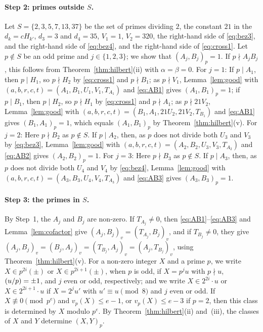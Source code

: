 \documentclass[11pt]{article}
\newcommand{\leg}[2]{\mathchoice{\biggl(\dfrac{#1}{#2}\biggr)}{(#1/#2)}{(#1/#2)}{(#1/#2)}}
\begin{document}
\paragraph{Step 2: primes outside $S$.} Let $S=\{2,3,5,7,13,37\}$ be the set of primes dividing $2$, the constant $21$ in the $d_k=cH_{k'}$, $d_{3}=3$ and $d_{4}=35$, $V_{1}=1$, $V_{2}=320$, the right-hand side of \eqref{eq:bez3}, and the right-hand side of \eqref{eq:bez4}, and the right-hand side of \eqref{eq:cross1}. Let $p\notin S$ be an odd prime and $j\in\{1,2,3\}$; we show that $(A_j,B_j)_p=1$. If $p\nmid A_jB_j$, this follows from Theorem~\ref{thm:hilbert}(ii) with $\alpha=\beta=0$. For $j=1$: If $p\mid A_{1}$, then $p\mid H_{1}$, so $p\nmid H_{2}$ by \eqref{eq:cross1} and $p\nmid B_{1}$; as $p\nmid V_{1}$, Lemma~\ref{lem:good} with $(a,b,r,c,t)=(A_{1},B_{1},U_{1},V_{1},T_{A_{1}})$ and \eqref{eq:AB1} gives $(A_{1},B_{1})_p=1$; if $p\mid B_{1}$, then $p\mid H_{2}$, so $p\nmid H_{1}$ by \eqref{eq:cross1} and $p\nmid A_{1}$; as $p\nmid 21V_{2}$, Lemma~\ref{lem:good} with $(a,b,r,c,t)=(B_{1},A_{1},21U_{2},21V_{2},T_{B_{1}})$ and \eqref{eq:AB1} gives $(B_{1},A_{1})_p=1$, which equals $(A_{1},B_{1})_p$ by Theorem~\ref{thm:hilbert}(v). For $j=2$: Here $p\nmid B_{2}$ as $p\notin S$. If $p\mid A_{2}$, then, as $p$ does not divide both $U_{3}$ and $V_{3}$ by \eqref{eq:bez3}, Lemma~\ref{lem:good} with $(a,b,r,c,t)=(A_{2},B_{2},U_{3},V_{3},T_{A_{2}})$ and \eqref{eq:AB2} gives $(A_{2},B_{2})_p=1$. For $j=3$: Here $p\nmid B_{3}$ as $p\notin S$. If $p\mid A_{3}$, then, as $p$ does not divide both $U_{4}$ and $V_{4}$ by \eqref{eq:bez4}, Lemma~\ref{lem:good} with $(a,b,r,c,t)=(A_{3},B_{3},U_{4},V_{4},T_{A_{3}})$ and \eqref{eq:AB3} gives $(A_{3},B_{3})_p=1$.

\paragraph{Step 3: the primes in $S$.} By Step~1, the $A_j$ and $B_j$ are non-zero. If $T_{A_j}\neq0$, then \eqref{eq:AB1}--\eqref{eq:AB3} and Lemma~\ref{lem:cofactor} give $(A_j,B_j)_v=(T_{A_j},B_j)_v$, and if $T_{B_j}\neq0$, they give $(A_j,B_j)_v=(B_j,A_j)_v=(T_{B_j},A_j)_v=(A_j,T_{B_j})_v$, using Theorem~\ref{thm:hilbert}(v). For a non-zero integer $X$ and a prime $p$, we write $X\in p^{2i}(\pm)$ or $X\in p^{2i+1}(\pm)$, when $p$ is odd, if $X=p^ju$ with $p\nmid u$, $\leg{u}{p}=\pm1$, and $j$ even or odd, respectively; and we write $X\in2^{2i}\cdot u$ or $X\in2^{2i+1}\cdot u$ if $X=2^ju'$ with $u'\equiv u\pmod 8$ and $j$ even or odd. If $X\not\equiv0\pmod{p^e}$ and $v_p(X)\leq e-1$, or $v_p(X)\leq e-3$ if $p=2$, then this class is determined by $X$ modulo $p^e$. By Theorem~\ref{thm:hilbert}(ii) and~(iii), the classes of $X$ and $Y$ determine $(X,Y)_p$.
\end{document}
